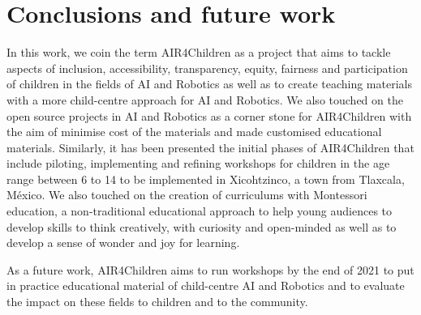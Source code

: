 \documentclass[sigconf]{acmart}
\begin{document}

\section{Conclusions and future work}
In this work, we coin the term AIR4Children as a project that aims to tackle aspects of inclusion, accessibility, transparency, equity, fairness and participation of children in the fields of AI and Robotics as well as to create teaching materials with a more child-centre approach for AI and Robotics.
We also touched on the open source projects in AI and Robotics as a corner stone for AIR4Children with the aim of minimise cost of the materials and made customised educational materials.  
Similarly, it has been presented the initial phases of AIR4Children that include piloting, implementing and refining workshops for children in the age range between 6 to 14 to be implemented in Xicohtzinco, a town from Tlaxcala, M\'exico.
We also touched on the creation of curriculums with Montessori education, a non-traditional educational approach to help young audiences to develop skills to think creatively, with curiosity and open-minded as well as to develop a sense of wonder and joy for learning.

As a future work, AIR4Children aims to run workshops by the end of 2021 to put in practice educational material of child-centre AI and Robotics and to evaluate the impact on these fields to children and to the community. 

\end{document}
